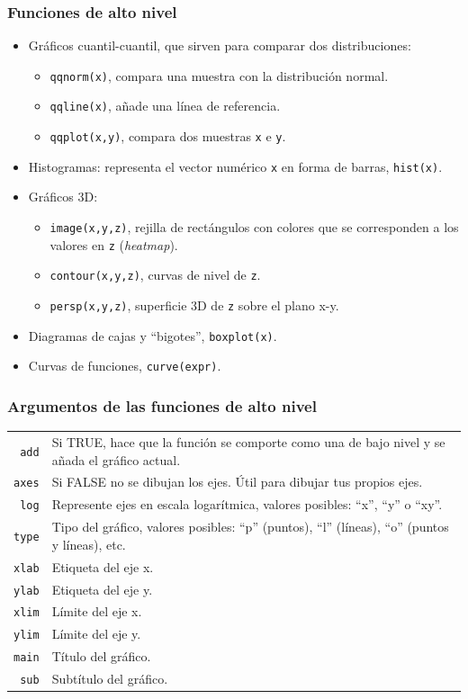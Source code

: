 \documentclass{beamer}
\begin{document}
\begin{frame}
\frametitle{Funciones de alto nivel}
\begin{itemize}
\item Gráficos cuantil-cuantil, que sirven para comparar dos distribuciones:
\begin{itemize}
\item \texttt{qqnorm(x)}, compara una muestra con la distribución normal.
\item \texttt{qqline(x)}, añade una línea de referencia.
\item \texttt{qqplot(x,y)}, compara dos muestras \texttt{x} e \texttt{y}.
\end{itemize}
\item Histogramas: representa el vector numérico \texttt{x} en forma de barras, \texttt{hist(x)}.
\item Gráficos 3D:
\begin{itemize}
\item \texttt{image(x,y,z)}, rejilla de rectángulos con colores que se corresponden a los valores en \texttt{z} (\textit{heatmap}).
\item \texttt{contour(x,y,z)}, curvas de nivel de \texttt{z}.
\item \texttt{persp(x,y,z)}, superficie 3D de \texttt{z} sobre el plano x-y.
\end{itemize}
\item Diagramas de cajas y ``bigotes'', \texttt{boxplot(x)}.
\item Curvas de funciones, \texttt{curve(expr)}.
\end{itemize}
\end{frame}

\begin{frame}
\frametitle{Argumentos de las funciones de alto nivel}
\begin{tabular}{rp{9cm}}
\texttt{add} & Si TRUE, hace que la función se comporte como una de bajo nivel y se añada el gráfico actual.\\
\texttt{axes} & Si FALSE no se dibujan los ejes. Útil para dibujar tus propios ejes.\\
\texttt{log} & Represente ejes en escala logarítmica, valores posibles: ``x'', ``y'' o ``xy''.\\
\texttt{type} & Tipo del gráfico, valores posibles: ``p'' (puntos), ``l'' (líneas), ``o'' (puntos y líneas), etc. \\
\texttt{xlab} & Etiqueta del eje x. \\
\texttt{ylab} & Etiqueta del eje y. \\
\texttt{xlim} & Límite del eje x. \\
\texttt{ylim} & Límite del eje y. \\
\texttt{main} & Título del gráfico. \\
\texttt{sub} & Subtítulo del gráfico. \\
\end{tabular}
\end{frame}
\end{document}
